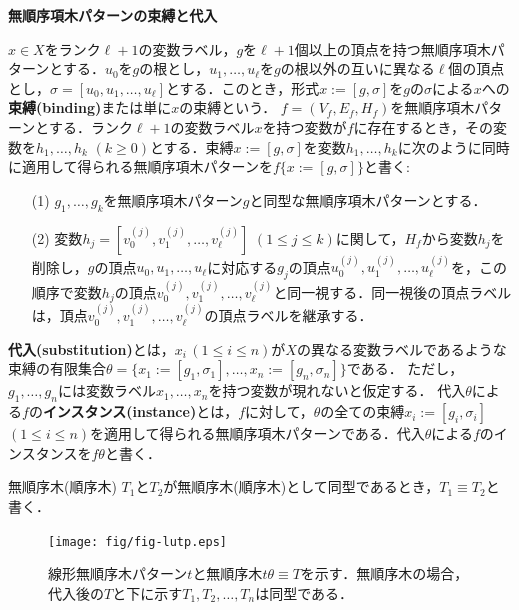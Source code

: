 \begin{define}{\bf 無順序項木パターンの束縛と代入}\par
  $x\in X$をランク$\ell+1$の変数ラベル，$g$を$\ell+1$個以上の頂点を持つ無順序項木パターンとする．$u_0$を$g$の根とし，$u_1,\ldots,u_{\ell}$を$g$の根以外の互いに異なる$\ell$個の頂点とし，$\sigma=[u_0,u_1,\ldots,u_{\ell}]$とする．このとき，形式$x:=[g,\sigma]$を$g$の$\sigma$による$x$への\textbf{束縛(binding)}または単に$x$の束縛という．
  $f=(V_{f},E_{f},H_{f})$を無順序項木パターンとする．ランク$\ell+1$の変数ラベル$x$を持つ変数が$f$に存在するとき，その変数を$h_1,\ldots,h_k$ $(k\geq 0)$とする．束縛$x:=[g,\sigma]$を変数$h_1,\ldots,h_k$に次のように同時に適用して得られる無順序項木パターンを$f\{x:=[g,\sigma]\}$と書く:
  \begin{enumerate}
    \item[(1)] $g_1,\ldots,g_k$を無順序項木パターン$g$と同型な無順序項木パターンとする．
    \item[(2)] 変数$h_j=[v_0^{(j)},v_1^{(j)},\ldots,v_{\ell}^{(j)}]$ $(1\leq j\leq k)$に関して，$H_f$から変数$h_j$を削除し，$g$の頂点$u_0,u_1,\ldots,u_{\ell}$に対応する$g_j$の頂点$u_0^{(j)},u_1^{(j)},\ldots,u_{\ell}^{(j)}$を，この順序で変数$h_j$の頂点$v_0^{(j)},v_1^{(j)},\ldots,v_{\ell}^{(j)}$と同一視する．同一視後の頂点ラベルは，頂点$v_0^{(j)},v_1^{(j)},\ldots,v_{\ell}^{(j)}$の頂点ラベルを継承する．
  \end{enumerate}
  \textbf{代入(substitution)}とは，$x_i\,(1\leq i\leq n)$が$X$の異なる変数ラベルであるような束縛の有限集合$\theta=\{x_1:=[g_1,\sigma_1],\ldots,x_n:=[g_n,\sigma_n]\}$である．
  ただし，$g_{1},\ldots,g_{n}$には変数ラベル$x_1,\ldots,x_n$を持つ変数が現れないと仮定する．
  代入$\theta$による$f$の\textbf{インスタンス(instance)}とは，$f$に対して，$\theta$の全ての束縛$x_i:=[g_i,\sigma_i]$ $(1\leq i\leq n)$を適用して得られる無順序項木パターンである．代入$\theta$による$f$のインスタンスを$f\theta$と書く．

  無順序木(順序木) $T_1$と$T_2$が無順序木(順序木)として同型であるとき，$T_1\equiv T_2$と書く．

  \begin{figure}[tb]
    \centering
    \texttt{[image: fig/fig-lutp.eps]}
    \caption{線形無順序木パターン$t$と無順序木$t\theta \equiv T$を示す．無順序木の場合，代入後の$T$と下に示す$T_1,T_2,\ldots ,T_n$は同型である．}\label{fig:lutp} %
  \end{figure}


\end{define}
